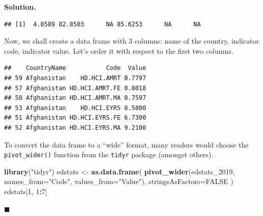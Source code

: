 \documentclass[10pt,b5paper,krantz1]{krantz}
\newenvironment{Shaded}{\begin{snugshade}}{\end{snugshade}}
\newcommand{\CommentTok}[1]{\textcolor[rgb]{0.37,0.37,0.37}{\textit{#1}}}
\newcommand{\DataTypeTok}[1]{\textcolor[rgb]{0.27,0.27,0.27}{#1}}
\newcommand{\DecValTok}[1]{\textcolor[rgb]{0.06,0.06,0.06}{#1}}
\newcommand{\KeywordTok}[1]{\textcolor[rgb]{0.27,0.27,0.27}{\textbf{#1}}}
\newcommand{\NormalTok}[1]{#1}
\newcommand{\OperatorTok}[1]{\textcolor[rgb]{0.43,0.43,0.43}{\textbf{#1}}}
\newcommand{\OtherTok}[1]{\textcolor[rgb]{0.37,0.37,0.37}{#1}}
\newcommand{\StringTok}[1]{\textcolor[rgb]{0.5,0.5,0.5}{#1}}
\newenvironment{solution}{%
\bigskip\noindent\textbf{Solution. }%
\it\ignorespaces%
\ignorespaces%
}{\ignorespaces%
\hfill$\blacksquare$%
}
\begin{document}
\begin{solution}
\begin{verbatim}
## [1]  4.0589 82.8503      NA 85.6253      NA      NA
\end{verbatim}

Now, we shall create a data frame with 3 columns:
name of the country, indicator code, indicator value.
Let's order it with respect to the first two columns.

\begin{Shaded}
\end{Shaded}

\begin{verbatim}
##    CountryName           Code  Value
## 59 Afghanistan    HD.HCI.AMRT 0.7797
## 57 Afghanistan HD.HCI.AMRT.FE 0.8018
## 58 Afghanistan HD.HCI.AMRT.MA 0.7597
## 53 Afghanistan    HD.HCI.EYRS 8.5800
## 51 Afghanistan HD.HCI.EYRS.FE 6.7300
## 52 Afghanistan HD.HCI.EYRS.MA 9.2100
\end{verbatim}

To convert the data frame to a ``wide'' format, many readers would choose
the \texttt{pivot\_wider()} function from the \texttt{tidyr} package
(amongst others).

\begin{Shaded}
\begin{Highlighting}[]
\KeywordTok{library}\NormalTok{(}\StringTok{"tidyr"}\NormalTok{)}
\NormalTok{edstats <-}\StringTok{ }\KeywordTok{as.data.frame}\NormalTok{(}
    \KeywordTok{pivot_wider}\NormalTok{(edstats_}\DecValTok{2019}\NormalTok{, }\DataTypeTok{names_from=}\StringTok{"Code"}\NormalTok{, }\DataTypeTok{values_from=}\StringTok{"Value"}\NormalTok{),}
    \DataTypeTok{stringsAsFactors=}\OtherTok{FALSE}
\NormalTok{)}
\NormalTok{edstats[}\DecValTok{1}\NormalTok{, }\DecValTok{1}\OperatorTok{:}\DecValTok{7}\NormalTok{]}
\end{Highlighting}
\end{Shaded}


\end{solution}
\end{document}
